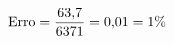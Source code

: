 \documentclass[preview]{standalone}
\begin{document}
\begin{align*}
\special{dvisvgm:raw <g id='unique000'>}\text{Erro} = \frac{63{,}7}{6371} = 0{,}01 = 1\%\special{dvisvgm:raw </g>}
\end{align*}
\end{document}
